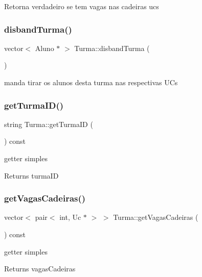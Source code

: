 Retorna verdadeiro se tem vagas nas cadeiras ucs \hypertarget{class_turma_ae184df49282ba96f9621d20d6cf0ed40}{}\label{class_turma_ae184df49282ba96f9621d20d6cf0ed40} 
\subsubsection{\texorpdfstring{disband\+Turma()}{disbandTurma()}}
{\footnotesize\ttfamily vector$<$ Aluno $\ast$ $>$ Turma\+::disband\+Turma (\begin{DoxyParamCaption}{ }\end{DoxyParamCaption})}

manda tirar os alunos desta turma nas respectivas U\+Cs \hypertarget{class_turma_ac2c81d5b5bf756a4a8c779566cc208e6}{}\label{class_turma_ac2c81d5b5bf756a4a8c779566cc208e6} 
\subsubsection{\texorpdfstring{get\+Turma\+I\+D()}{getTurmaID()}}
{\footnotesize\ttfamily string Turma\+::get\+Turma\+ID (\begin{DoxyParamCaption}{ }\end{DoxyParamCaption}) const}

getter simples \begin{DoxyReturn}{Returns}
turma\+ID 
\end{DoxyReturn}
\hypertarget{class_turma_ac70cc3ddd76633aad166753d9a14a42e}{}\label{class_turma_ac70cc3ddd76633aad166753d9a14a42e} 
\subsubsection{\texorpdfstring{get\+Vagas\+Cadeiras()}{getVagasCadeiras()}}
{\footnotesize\ttfamily vector$<$ pair$<$ int, Uc $\ast$ $>$ $>$ Turma\+::get\+Vagas\+Cadeiras (\begin{DoxyParamCaption}{ }\end{DoxyParamCaption}) const}

getter simples \begin{DoxyReturn}{Returns}
vagas\+Cadeiras 
\end{DoxyReturn}
\hypertarget{class_turma_ae717553d232237f5779b3f5c83b0abcb}{}\label{class_turma_ae717553d232237f5779b3f5c83b0abcb} 

